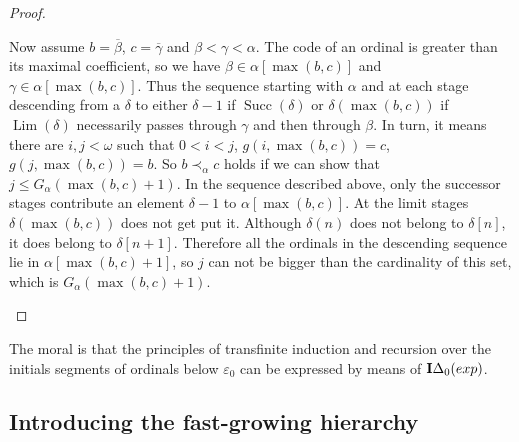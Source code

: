 \documentclass[8pt]{article}
\theoremstyle{definition}
\theoremstyle{definition}
\theoremstyle{definition}
\theoremstyle{definition}
\theoremstyle{definition}
\theoremstyle{definition}
\theoremstyle{definition}
\theoremstyle{definition}
\theoremstyle{definition}
\theoremstyle{definition}
\theoremstyle{definition}
\theoremstyle{definition}
\theoremstyle{definition}
\theoremstyle{question}
\begin{document}
\begin{proof}
\begin{enumerate}
    Now assume $b = \overline{\beta}$, $c = \overline{\gamma}$ and $\beta < \gamma < \alpha$.
    The code of an ordinal is greater than its maximal coefficient, so we have
    $\beta \in \alpha[\max(b,c)]$ and $\gamma \in \alpha[\max(b,c)]$. Thus the sequence starting
    with $\alpha$ and at each stage descending from a $\delta$ to either $\delta - 1$ if
    $\operatorname{Succ}(\delta)$ or $\delta(\max(b,c))$ if $\operatorname{Lim}(\delta)$ necessarily 
    passes through $\gamma$ and then through $\beta$.
    In turn, it means there are $i, j < \omega$ such that $0 < i < j$, $g(i, \max(b, c)) = c$, $g(j, \max(b, c)) = b$.
    So $b \prec_{\alpha} c$ holds if we can show that $j \leq G_{\alpha}(\max(b,c) + 1)$.
    In the sequence described above, only the successor stages contribute an element $\delta - 1$ to
    $\alpha[\max(b,c)]$. At the limit stages $\delta(\max(b, c))$ does not get put it.
    Although $\delta(n)$ does not belong to $\delta[n]$, it does belong to $\delta[n + 1]$.
    Therefore all the ordinals in the descending sequence lie in $\alpha[\max(b,c) + 1]$, so $j$ can not be bigger
    than the cardinality of this set, which is $G_{\alpha}(\max(b,c) + 1)$.
  \end{enumerate}
\end{proof}

The moral is that the principles of transfinite induction and recursion over the initials segments of ordinals below
$\varepsilon_0$ can be expressed by means of ${\bf I}\Delta_0(exp)$.

\subsection{Introducing the fast-growing hierarchy}
\end{document}
